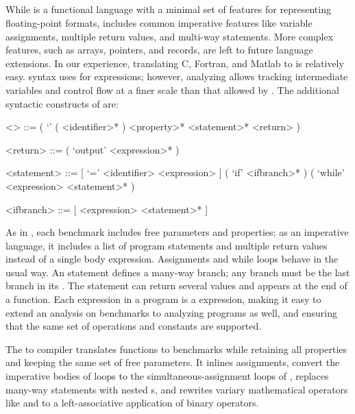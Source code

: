 \documentclass[main.tex]{subfiles}
\begin{document}
\subsection{\surface}

While \core is a functional language
  with a minimal set of features
  for representing floating-point formats,
  \surface includes common imperative features
  like variable assignments,
  multiple return values,
  and multi-way  statements.
More complex features,
  such as arrays, pointers, and records,
  are left to future language extensions.
In our experience,
  translating C, Fortran, and Matlab to \surface is relatively easy.
\surface syntax uses \core for expressions;
  however, analyzing \surface allows tracking intermediate variables
  and control flow at a finer scale than that allowed by \core.
The additional syntactic constructs of \surface are:

\begin{grammar}
<\surface> ::= ( `\surface' ( <identifier>* ) <property>* <statement>* <return> )

<return> ::= ( `output' <expression>* )

<statement> ::= [ `=' <identifier> <expression> ]
\alt ( `if' <ifbranch>* )
\alt ( `while' <expression> <statement>* )

<ifbranch> ::= [ <expression> <statement>* ]
\end{grammar}

As in \core, each \surface benchmark
  includes free parameters and properties;
  as an imperative language,
  it includes a list of program statements
  and multiple return values
  instead of a single body expression.
Assignments and while loops behave in the usual way.
An  statement defines a many-way branch;
  any  branch must be the last branch in its .
The  statement can return several values and appears
  at the end of a function.
Each expression in a \surface program is a \core expression,
  making it easy to extend an analysis on \core benchmarks
  to analyzing \surface programs as well,
  and ensuring that the same set of operations and constants
  are supported.

The \surface to \core compiler
  translates \surface functions to \core benchmarks
  while retaining all properties and keeping the same set of free parameters.
It inlines assignments, convert the imperative bodies of \surface loops
  to the simultaneous-assignment loops of \core,
  replaces many-way  statements with nested s,
  and rewrites variary mathematical operators like \C{+} and \C{*}
  to a left-associative application of binary operators.
\end{document}
